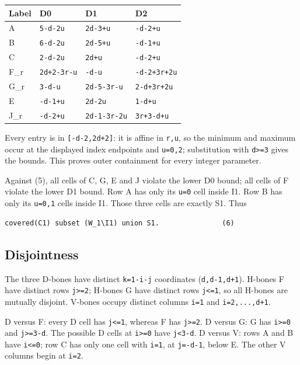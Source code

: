 \documentclass[
  10pt,
]{scrreprt}
\begin{document}
\begin{longtable}[]{@{}llll@{}}
\toprule\noalign{}
Label & D0 & D1 & D2 \\
\midrule\noalign{}
\endhead
\bottomrule\noalign{}
\endlastfoot
A & \texttt{5-d-2u} & \texttt{2d-3+u} & \texttt{-d-2+u} \\
B & \texttt{6-d-2u} & \texttt{2d-5+u} & \texttt{-d-1+u} \\
C & \texttt{2-d-2u} & \texttt{2d+u} & \texttt{-d-2+u} \\
F\_r & \texttt{2d+2-3r-u} & \texttt{-d-u} & \texttt{-d-2+3r+2u} \\
G\_r & \texttt{3-d-u} & \texttt{2d-5-3r-u} & \texttt{2-d+3r+2u} \\
E & \texttt{-d-1+u} & \texttt{2d-2u} & \texttt{1-d+u} \\
J\_r & \texttt{-d-2+u} & \texttt{2d-1-3r-2u} & \texttt{3r+3-d+u} \\
\end{longtable}

Every entry is in \texttt{{[}-d-2,2d+2{]}}: it is affine in
\texttt{r,u}, so the minimum and maximum occur at the displayed index
endpoints and \texttt{u=0,2}; substitution with
\texttt{d\textgreater{}=3} gives the bounds. This proves outer
containment for every integer parameter.

Against (5), all cells of C, G, E and J violate the lower D0 bound; all
cells of F violate the lower D1 bound. Row A has only its \texttt{u=0}
cell inside I1. Row B has only its \texttt{u=0,1} cells inside I1. Those
three cells are exactly S1. Thus

\begin{verbatim}
covered(C1) subset (W_1\I1) union S1.               (6)
\end{verbatim}

\subsection{Disjointness}\label{edition-4-section-5}

The three D-bones have distinct \texttt{k=1-i-j} coordinates
(\texttt{d,d-1,d+1}). H-bones F have distinct rows
\texttt{j\textgreater{}=2}; H-bones G have distinct rows
\texttt{j\textless{}=1}, so all H-bones are mutually disjoint. V-bones
occupy distinct columns \texttt{i=1} and \texttt{i=2,...,d+1}.

D versus F: every D cell has \texttt{j\textless{}=1}, whereas F has
\texttt{j\textgreater{}=2}. D versus G: G has \texttt{i\textgreater{}=0}
and \texttt{j\textgreater{}=3-d}. The possible D cells at
\texttt{i\textgreater{}=0} have \texttt{j\textless{}3-d}. D versus V:
rows A and B have \texttt{i\textless{}=0}; row C has only one cell with
\texttt{i=1}, at \texttt{j=-d-1}, below E. The other V columns begin at
\texttt{i=2}.
\end{document}
